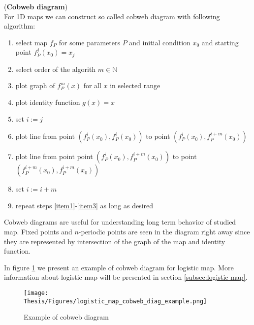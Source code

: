 \begin{definition} (\textbf{Cobweb diagram}) \\
    \label{def:cobweb}
    For 1D maps we can construct so called cobweb diagram with following algorithm:
    \begin{enumerate}
        \item select map $f_P$ for some parameters $P$ and initial condition $x_0$ and starting point $f^{j}_P(x_0) = x_j$
        \item select order of the algorith $m \in \mathbb{N}$
        \item plot graph of $f^{m}_P(x)$ for all $x$ in selected range
        \item plot identity function $g(x) = x$
        \item set $i:=j$

        \item plot line from point $(f^{i}_P(x_0), f^{i}_P(x_0))$ to point $(f^{i}_P(x_0), f^{i+m}_P(x_0))$ \label{item1}
        \item plot line from point point $(f^{i}_P(x_0), f^{i+m}_P(x_0))$ to point $(f^{i+m}_P(x_0), f^{i+m}_P(x_0))$ \label{item2}
        \item set $i:=i+m$ \label{item3}

        \item repeat steps \ref{item1}-\ref{item3} as long as desired
    \end{enumerate}

\end{definition}

\begin{remark}
    Cobweb diagrams are useful for understanding long term behavior of studied map.
    Fixed points and $n$-periodic points are seen in the diagram right away since they are represented by intersection of the graph of the map and identity function.
\end{remark}

\begin{example}
    In figure \ref{fig:cobweb_diag_example} we present an example of cobweb diagram for logistic map. More information about logistic map will be presented in section \ref{subsec:logistic map}.
    \begin{figure}[!h]
        \centering
        \texttt{[image: Thesis/Figures/logistic\_map\_cobweb\_diag\_example.png]}
        \caption{Example of cobweb diagram}
        \label{fig:cobweb_diag_example}
    \end{figure}
\end{example}

